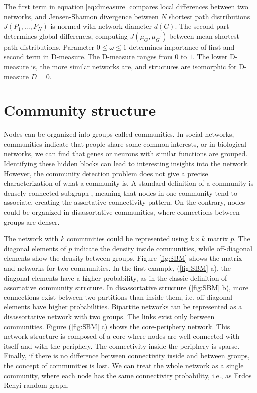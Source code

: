 The first term in equation \ref{eq:dmeasure} compares local differences between two networks, and Jensen-Shannon divergence between $N$ shortest path distributions $J(P_{1},..., P_{N})$ is normed with network diameter $d(G)$. The second part determines global differences, computing  ${J(\mu_{G},\mu_{G^{'}})}$ between mean shortest path distributions. Parameter $0 \leq \omega \leq1$ determines importance of first and second term in D-measure. The D-measure ranges from $0$ to $1$. The lower D-measure is, the more similar networks are, and structures are isomorphic for D-measure $D = 0$.


\section{Community structure}

Nodes can be organized into groups called communities. In social networks, communities indicate that people share some common interests, or in biological networks, we can find that genes or neurons with similar functions are grouped. Identifying these hidden blocks can lead to interesting insights into the network. However, the community detection problem does not give a precise characterization of what a community is. A standard definition of a community is densely connected subgraph \cite{fortunato2010community, martin}, meaning that nodes in one community tend to associate, creating the assortative connectivity pattern. On the contrary, nodes could be organized in disassortative communities, where connections between groups are denser. 

The network with $k$ communities could be represented using $k \times k$ matrix $p$. The diagonal elements of $p$ indicate the density inside communities, while off-diagonal elements show the density between groups. Figure \ref{fig:SBM} \cite{fortunato2016community} shows the matrix and networks for two communities. In the first example, (\ref{fig:SBM} a), the diagonal elements have a higher probability, as in the classic definition of assortative community structure. In disassortative structure (\ref{fig:SBM} b), more connections exist between two partitions than inside them, i.e. off-diagonal elements have higher probabilities. Bipartite networks can be represented as a disassortative network with two groups. The links exist only between communities. Figure (\ref{fig:SBM} c) shows the core-periphery network. This network structure is composed of a core where nodes are well connected with itself and with the periphery. The connectivity inside the periphery is sparse. Finally, if there is no difference between connectivity inside and between groups, the concept of communities is lost. We can treat the whole network as a single community, where each node has the same connectivity probability, i.e., as Erdos Renyi random graph. 

